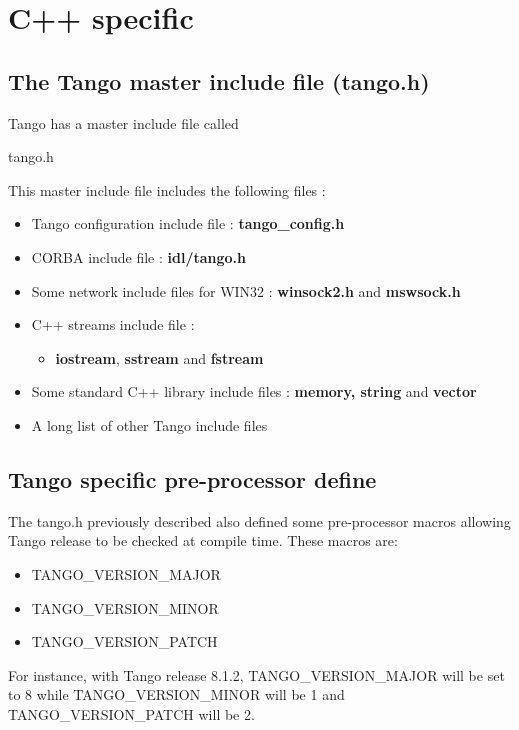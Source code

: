\vspace{0.3cm}


\section{C++ specific}

\subsection{The Tango master include file (tango.h)}

Tango has a master include file called \begin{center}tango.h\end{center} This
master include file includes the following files :
\begin{itemize}
\item Tango configuration include file : \textbf{tango\_config.h}
\item CORBA include file : \textbf{idl/tango.h}
\item Some network include files for WIN32 : \textbf{winsock2.h} and \textbf{mswsock.h}
\item C++ streams include file :

\begin{itemize}
\item \textbf{iostream}, \textbf{sstream} and \textbf{fstream} 
\end{itemize}
\item Some standard C++ library include files : \textbf{memory, string}
and \textbf{vector}
\item A long list of other Tango include files
\end{itemize}

\subsection{Tango specific pre-processor define}

The tango.h previously described also defined some pre-processor macros
allowing Tango release to be checked at compile time. These macros
are:
\begin{itemize}
\item TANGO\_VERSION\_MAJOR
\item TANGO\_VERSION\_MINOR
\item TANGO\_VERSION\_PATCH
\end{itemize}
For instance, with Tango release 8.1.2, TANGO\_VERSION\_MAJOR will
be set to 8 while TANGO\_VERSION\_MINOR will be 1 and TANGO\_VERSION\_PATCH
will be 2.

